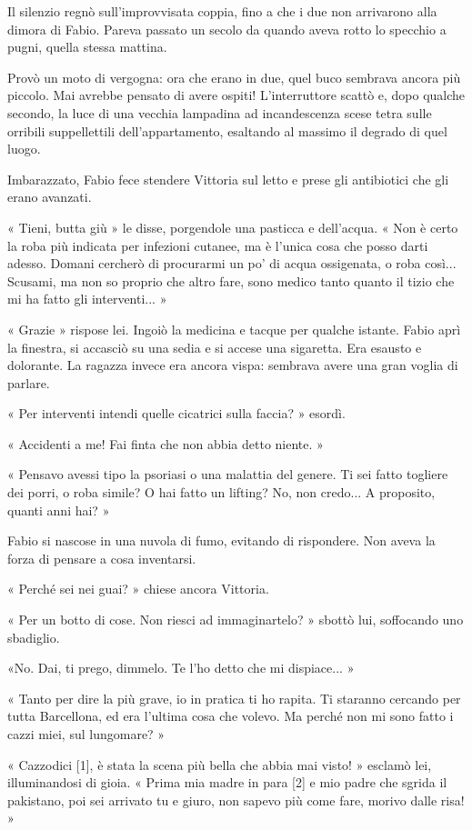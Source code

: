 Il silenzio regnò sull'improvvisata coppia, fino a che i due non arrivarono alla dimora di Fabio. Pareva passato un secolo da quando aveva rotto lo specchio a pugni, quella stessa mattina.

Provò un moto di vergogna: ora che erano in due, quel buco sembrava ancora più piccolo. Mai avrebbe pensato di avere ospiti! L'interruttore scattò e, dopo qualche secondo, la luce di una vecchia lampadina ad incandescenza scese tetra sulle orribili suppellettili dell'appartamento, esaltando al massimo il degrado di quel luogo.

Imbarazzato, Fabio fece stendere Vittoria sul letto e prese gli antibiotici che gli erano avanzati.

« Tieni, butta giù » le disse, porgendole una pasticca e dell'acqua. « Non è certo la roba più indicata per infezioni cutanee, ma è l'unica cosa che posso darti adesso. Domani cercherò di procurarmi un po' di acqua ossigenata, o roba così... Scusami, ma non so proprio che altro fare, sono medico tanto quanto il tizio che mi ha fatto gli interventi... »

« Grazie » rispose lei. Ingoiò la medicina e tacque per qualche istante. Fabio aprì la finestra, si accasciò su una sedia e si accese una sigaretta. Era esausto e dolorante. La ragazza invece era ancora vispa: sembrava avere una gran voglia di parlare.

« Per interventi intendi quelle cicatrici sulla faccia? » esordì.

« Accidenti a me! Fai finta che non abbia detto niente. »

« Pensavo avessi tipo la psoriasi o una malattia del genere. Ti sei fatto togliere dei porri, o roba simile? O hai fatto un lifting? No, non credo... A proposito, quanti anni hai? »

Fabio si nascose in una nuvola di fumo, evitando di rispondere. Non aveva la forza di pensare a cosa inventarsi.

« Perché sei nei guai? » chiese ancora Vittoria.

« Per un botto di cose. Non riesci ad immaginartelo? » sbottò lui, soffocando uno sbadiglio.

«No. Dai, ti prego, dimmelo. Te l'ho detto che mi dispiace... »

« Tanto per dire la più grave, io in pratica ti ho rapita. Ti staranno cercando per tutta Barcellona, ed era l'ultima cosa che volevo. Ma perché non mi sono fatto i cazzi miei, sul lungomare? »

« Cazzodici [1], è stata la scena più bella che abbia mai visto! » esclamò lei, illuminandosi di gioia. « Prima mia madre in para [2] e mio padre che sgrida il pakistano, poi sei arrivato tu e giuro, non sapevo più come fare, morivo dalle risa! »

